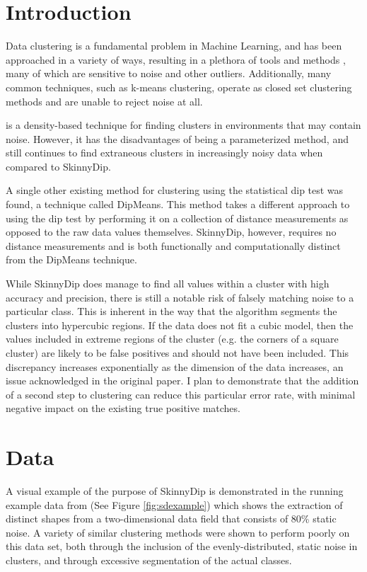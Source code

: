 \documentclass{sig-alternate-05-2015}
\begin{document}
\section{Introduction}
Data clustering is a fundamental problem in Machine Learning, and has been approached in a variety of ways, resulting in a plethora of tools and methods \cite{ClusteringMethods}, many of which are sensitive to noise and other outliers. Additionally, many common techniques, such as k-means clustering, operate as closed set clustering methods and are unable to reject noise at all.

\cite{DBSCAN} is a density-based technique for finding clusters in environments that may contain noise. However, it has the disadvantages of being a parameterized method, and still continues to find extraneous clusters in increasingly noisy data when compared to SkinnyDip.

A single other existing method for clustering using the statistical dip test was found, a technique called DipMeans\cite{dipmeans}. This method takes a different approach to using the dip test by performing it on a collection of distance measurements as opposed to the raw data values themselves. SkinnyDip, however, requires no distance measurements  and is both functionally and computationally distinct from the DipMeans technique.

While SkinnyDip does manage to find all values within a cluster with high accuracy and precision, there is still a notable risk of falsely matching noise to a particular class. This is inherent in the way that the algorithm segments the clusters into hypercubic regions. If the data does not fit a cubic model, then the values included in extreme regions of the cluster (e.g. the corners of a square cluster) are likely to be false positives and should not have been included. This discrepancy increases exponentially as the dimension of the data increases, an issue acknowledged in the original paper\cite{skinnydip}. I plan to demonstrate that the addition of a second step to clustering can reduce this particular error rate, with minimal negative impact on the existing true positive matches.

\section{Data}
A visual example of the purpose of SkinnyDip is demonstrated in the running example data from \cite{skinnydip} (See Figure \ref{fig:sdexample}) which shows the extraction of distinct shapes from a two-dimensional data field that consists of 80\% static noise. A variety of similar clustering methods were shown to perform poorly on this data set, both through the inclusion of the evenly-distributed, static noise in clusters, and through excessive segmentation of the actual classes.
\end{document}
